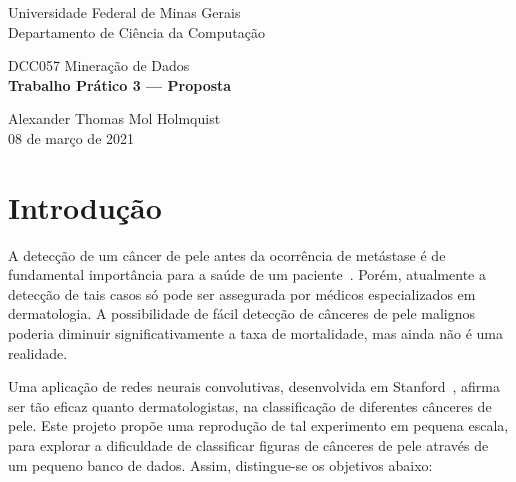 \documentclass[12pt,oneside,a4paper]{article}
\begin{document}
\begin{titlepage}
\enlargethispage{\footskip}
\setlength{\parindent}{0pt}

\begin{center}
    \onehalfspacing
    \Large Universidade Federal de Minas Gerais
    \\ Departamento de Ciência da Computação
    
    \vspace{80mm}
    
    \Large{DCC057 Mineração de Dados}
    \\ \Large \textbf{Trabalho Prático 3 --- Proposta}
    
\end{center}

\vspace{\fill}

\begin{minipage}[b]{\textwidth}
    \centering
    \onehalfspacing
    \large
    Alexander Thomas Mol Holmquist \\
    08 de março de 2021

\end{minipage}

\end{titlepage}

\justify

\section{Introdução}


A detecção de um câncer de pele antes da ocorrência de metástase é de fundamental importância para a saúde de um paciente~\cite{SBD, ISIC}. Porém, atualmente a detecção de tais casos só pode ser assegurada por médicos especializados em dermatologia. A possibilidade de fácil detecção de cânceres de pele malignos poderia diminuir significativamente a taxa de mortalidade, mas ainda não é uma realidade.

Uma aplicação de redes neurais convolutivas, desenvolvida em Stanford~\cite{Stanford}, afirma ser tão eficaz quanto dermatologistas, na classificação de diferentes cânceres de pele. Este projeto propõe uma reprodução de tal experimento em pequena escala, para explorar a dificuldade de classificar figuras de cânceres de pele através de um pequeno banco de dados. Assim, distingue-se os objetivos abaixo:
\end{document}
